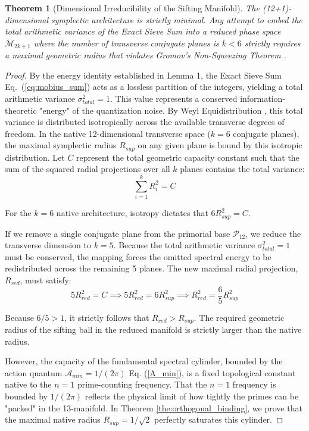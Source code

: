 \documentclass[sn-mathphys-num, pdflatex, referee]{sn-jnl}
\newtheorem{theorem}{Theorem}[section]
\begin{document}
\begin{theorem}[Dimensional Irreducibility of the Sifting Manifold]
\label{the:dimensional_irreducibility}
The (12+1)-dimensional symplectic architecture is strictly minimal. Any attempt to embed the total arithmetic variance of the Exact Sieve Sum into a reduced phase space $\mathcal{M}_{2k+1}$ where the number of transverse conjugate planes is $k < 6$ strictly requires a maximal geometric radius that violates Gromov's Non-Squeezing Theorem \cite{gromov}.
\end{theorem}

\begin{proof}
By the energy identity established in Lemma 1, the Exact Sieve Sum Eq.~(\ref{eq:mobius_sum}) acts as a lossless partition of the integers, yielding a total arithmetic variance $\sigma_{total}^2 = 1$. This value represents a conserved information-theoretic "energy" of the quantization noise. 
By Weyl Equidistribution \cite{weyl}, this total variance is distributed isotropically across the available transverse degrees of freedom. In the native 12-dimensional transverse space ($k=6$ conjugate planes), the maximal symplectic radius $R_{sup}$ on any given plane is bound by this isotropic distribution. Let $C$ represent the total geometric capacity constant such that the sum of the squared radial projections over all $k$ planes contains the total variance:
$$ \sum_{i=1}^{k} R_i^2 = C $$

\noindent For the $k=6$ native architecture, isotropy dictates that $6 R_{sup}^2 = C$. 

If we remove a single conjugate plane from the primorial base $\mathcal{P}_{12}$, we reduce the transverse dimension to $k=5$. Because the total arithmetic variance $\sigma_{total}^2 = 1$ must be conserved, the mapping forces the omitted spectral energy to be redistributed across the remaining 5 planes. The new maximal radial projection, $R_{red}$, must satisfy:
$$ 5 R_{red}^2 = C \implies 5 R_{red}^2 = 6 R_{sup}^2 \implies R_{red}^2 = \frac{6}{5} R_{sup}^2 $$

\noindent Because $6/5 > 1$, it strictly follows that $R_{red} > R_{sup}$. The required geometric radius of the sifting ball in the reduced manifold is strictly larger than the native radius.

However, the capacity of the fundamental spectral cylinder, bounded by the action quantum $\mathcal{A}_{min} = 1/(2\pi)$ Eq. (\ref{A_min}), is a fixed topological constant native to the $n=1$ prime-counting frequency. That the $n=1$ frequency is bounded by $1/(2\pi)$ reflects the physical limit of how tightly the primes can be "packed" in the 13-manifold. In Theorem \ref{the:orthogonal_binding}, we prove that the maximal native radius $R_{sup} = 1/\sqrt{2}$ perfectly saturates this cylinder. 


\end{proof}
\end{document}
